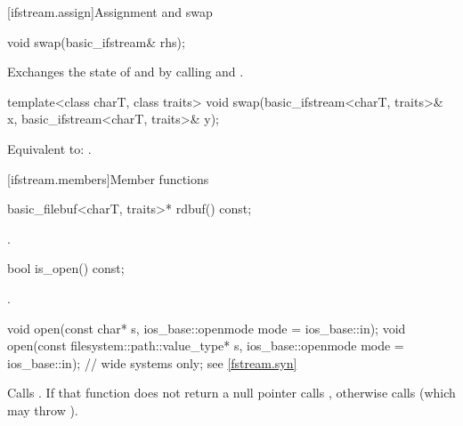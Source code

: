 [ifstream.assign]{Assignment and swap}

%
\begin{itemdecl}
void swap(basic_ifstream& rhs);
\end{itemdecl}

\begin{itemdescr}
\pnum
\effects
Exchanges the state of 
and  by calling
 and
.
\end{itemdescr}

%
\begin{itemdecl}
template<class charT, class traits>
  void swap(basic_ifstream<charT, traits>& x,
            basic_ifstream<charT, traits>& y);
\end{itemdecl}

\begin{itemdescr}
\pnum
\effects
Equivalent to: .
\end{itemdescr}

[ifstream.members]{Member functions}

%
\begin{itemdecl}
basic_filebuf<charT, traits>* rdbuf() const;
\end{itemdecl}

\begin{itemdescr}
\pnum
\returns
{}.
\end{itemdescr}

%
\begin{itemdecl}
bool is_open() const;
\end{itemdecl}

\begin{itemdescr}
\pnum
\returns
{}.
\end{itemdescr}

%
\begin{itemdecl}
void open(const char* s, ios_base::openmode mode = ios_base::in);
void open(const filesystem::path::value_type* s,
          ios_base::openmode mode = ios_base::in);  // wide systems only; see \ref{fstream.syn}
\end{itemdecl}

\begin{itemdescr}
\pnum
\effects
Calls
.
If that function does not return a null pointer
calls ,
otherwise calls
(which may throw
).
\end{itemdescr}

